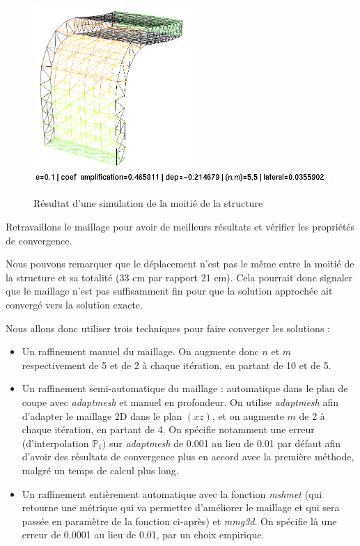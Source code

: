     \begin{figure}        
        \begin{center}
        
            \includegraphics[width=6cm]{imgs/half_simu.PNG}
            \includegraphics[width=12cm ]{imgs/half_simu_label.PNG}
            \caption{Résultat d'une simulation de la moitié de la structure}
            \label{fig:simu_def_moitie}
        
        \end{center}
    \end{figure}


\begin{problem}{4}
    Retravaillons le maillage pour avoir de meilleurs résultats et vérifier les propriétés de convergence.
\end{problem}

    Nous pouvons remarquer que le déplacement n'est pas le même entre la moitié de la structure et sa totalité (33 cm par rapport 21 cm).
    Cela pourrait donc signaler que le maillage n'est pas suffisamment fin pour que la solution approchée ait convergé vers la solution exacte.

    Nous allons donc utiliser trois techniques pour faire converger les solutions :
    \begin{itemize}
        \item Un raffinement manuel du maillage. On augmente donc $n$ et $m$ respectivement de 5 et de 2 à chaque itération, en partant de 10 et de 5.
        \item Un raffinement semi-automatique du maillage : automatique dans le plan de coupe avec \emph{adaptmesh} et manuel en profondeur. On utilise \emph{adaptmesh} afin d'adapter le maillage 2D
        dans le plan $(xz)$,
                et on augmente $m$ de 2 à chaque itération, en partant de 4. On spécifie 
                notamment une erreur (d'interpolation $\mathbb{P}_1$) sur \emph{adaptmesh} de 0.001 au lieu de 0.01 par défaut afin d'avoir des 
                résultats de convergence plus en accord avec la première méthode, malgré un temps de calcul plus long.
        \item Un raffinement entièrement automatique avec la fonction \emph{mshmet} (qui retourne une métrique qui va permettre
        d'améliorer le maillage et qui sera passée en paramètre de la fonction ci-après) et \emph{mmg3d}.
            On spécifie là une erreur de 0.0001 au lieu de 0.01, par un choix empirique.
    \end{itemize}
    

